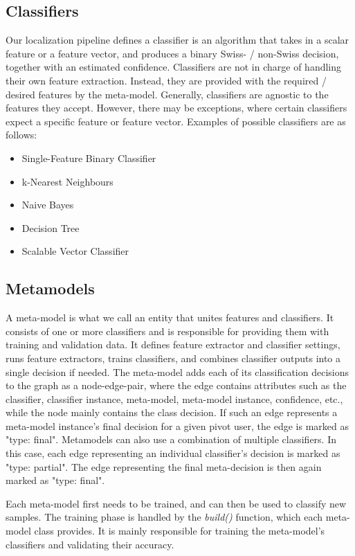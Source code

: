 \documentclass[10pt,a4paper]{article}
\begin{document}
\subsection{Classifiers}
Our localization pipeline defines a classifier is an algorithm that takes in a scalar feature or a feature vector, and produces  a binary Swiss- / non-Swiss decision, together with an estimated confidence. Classifiers are not in charge of handling their own feature extraction. Instead, they are provided with the required / desired features by the meta-model. Generally, classifiers are agnostic to the features they accept. However, there may be exceptions, where certain classifiers expect a specific feature or feature vector. Examples of possible classifiers are as follows:
\begin{itemize}
\item Single-Feature Binary Classifier
\item k-Nearest Neighbours
\item Naive Bayes
\item Decision Tree
\item Scalable Vector Classifier
\end{itemize}

\subsection{Metamodels}
A meta-model is what we call an entity that unites features and classifiers. It consists of one or more classifiers and is responsible for providing them with training and validation data. It defines feature extractor and classifier settings, runs feature extractors, trains classifiers, and combines classifier outputs into a single decision if needed. The meta-model adds each of its classification decisions to the graph as a node-edge-pair, where the edge contains attributes such as the classifier, classifier instance, meta-model, meta-model instance, confidence, etc., while the node mainly contains the class decision. If such an edge represents a meta-model instance's final decision for a given pivot user, the edge is marked as "type: final". Metamodels can also use a combination of multiple classifiers. In this case, each edge representing an individual classifier's decision is marked as "type: partial". The edge representing the final meta-decision is then again marked as "type: final".

Each meta-model first needs to be trained, and can then be used to classify new samples. The training phase is handled by the \textit{build()} function, which each meta-model class provides. It is mainly responsible for training the meta-model's classifiers and validating their accuracy.
\end{document}
